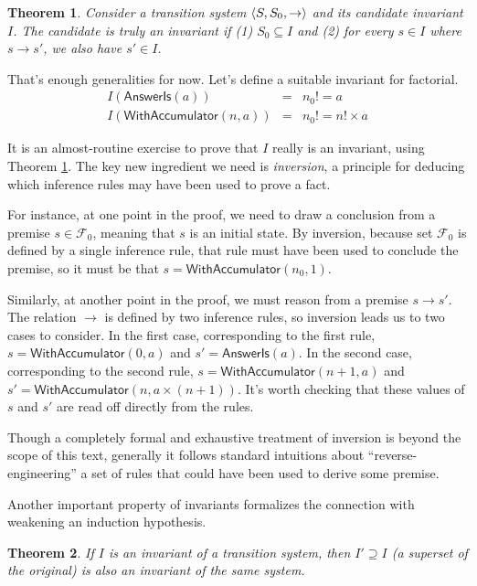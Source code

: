 \documentclass{amsbook}
\newtheorem{theorem}{Theorem}[chapter]
\theoremstyle{definition}
\theoremstyle{remark}
\numberwithin{section}{chapter}
\numberwithin{equation}{chapter}
\begin{document}
\begin{theorem}\label{invariant_induction}
  Consider a transition system ${\left \langle S, S_0, \to \right \rangle}$ and its candidate invariant $I$.  The candidate is truly an invariant if (1) $S_0 \subseteq I$ and (2) for every $s \in I$ where $s \to s'$, we also have $s' \in I$.
\end{theorem}

That's enough generalities for now.
Let's define a suitable invariant for factorial.
\invariants
\begin{eqnarray*}
  I(\mathsf{AnswerIs}(a)) &=& n_0! = a \\
  I(\mathsf{WithAccumulator}(n, a)) &=& n_0! = n! \times a
\end{eqnarray*}

It is an almost-routine exercise to prove that $I$ really is an invariant, using Theorem \ref{invariant_induction}.
The key new ingredient we need is \emph{inversion}, a principle for deducing which inference rules may have been used to prove a fact.

For instance, at one point in the proof, we need to draw a conclusion from a premise $s \in \mathcal F_0$, meaning that $s$ is an initial state.
By inversion, because set $\mathcal F_0$ is defined by a single inference rule, that rule must have been used to conclude the premise, so it must be that $s = \mathsf{WithAccumulator}(n_0, 1)$.

Similarly, at another point in the proof, we must reason from a premise $s \to s'$.
The relation $\to$ is defined by two inference rules, so inversion leads us to two cases to consider.
In the first case, corresponding to the first rule, $s = \mathsf{WithAccumulator}(0, a)$ and $s' = \mathsf{AnswerIs}(a)$.
In the second case, corresponding to the second rule, $s = \mathsf{WithAccumulator}(n+1, a)$ and $s' = \mathsf{WithAccumulator}(n, a \times (n+1))$.
It's worth checking that these values of $s$ and $s'$ are read off directly from the rules.

Though a completely formal and exhaustive treatment of inversion is beyond the scope of this text, generally it follows standard intuitions about ``reverse-engineering'' a set of rules that could have been used to derive some premise.

Another important property of invariants formalizes the connection with weakening an induction hypothesis.

\begin{theorem}\label{invariant_weaken}
  If $I$ is an invariant of a transition system, then $I' \supseteq I$ (a superset of the original) is also an invariant of the same system.
\end{theorem}
\end{document}
